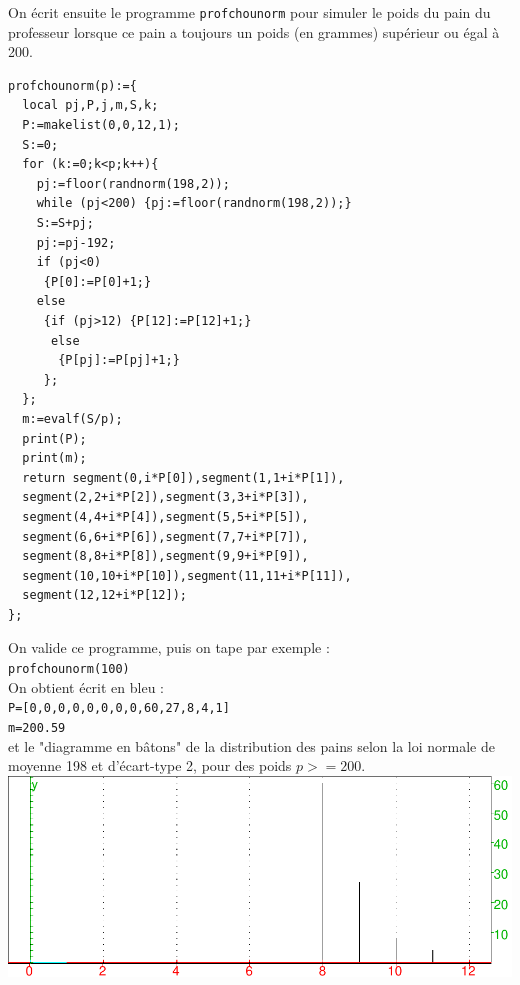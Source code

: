 \documentclass[a4paper,11pt]{book}
\begin{document}
On \'ecrit ensuite le programme {\tt profchounorm} pour simuler
le poids du pain du professeur lorsque ce pain a toujours un poids 
(en grammes) sup\'erieur ou \'egal \`a 200.
\begin{verbatim}
profchounorm(p):={
  local pj,P,j,m,S,k;
  P:=makelist(0,0,12,1);
  S:=0;
  for (k:=0;k<p;k++){
    pj:=floor(randnorm(198,2));	
    while (pj<200) {pj:=floor(randnorm(198,2));}
    S:=S+pj;
    pj:=pj-192;
    if (pj<0) 
     {P[0]:=P[0]+1;} 
    else
     {if (pj>12) {P[12]:=P[12]+1;}
      else
       {P[pj]:=P[pj]+1;}
     };
  };
  m:=evalf(S/p);
  print(P);
  print(m);
  return segment(0,i*P[0]),segment(1,1+i*P[1]),
  segment(2,2+i*P[2]),segment(3,3+i*P[3]),
  segment(4,4+i*P[4]),segment(5,5+i*P[5]),
  segment(6,6+i*P[6]),segment(7,7+i*P[7]),
  segment(8,8+i*P[8]),segment(9,9+i*P[9]),
  segment(10,10+i*P[10]),segment(11,11+i*P[11]),
  segment(12,12+i*P[12]);
};  
\end{verbatim}
On valide ce programme, puis on tape par exemple :\\
{\tt profchounorm(100)}\\
On obtient \'ecrit en bleu :\\
{\tt P=[0,0,0,0,0,0,0,0,60,27,8,4,1]}\\
{\tt m=200.59}\\
et le "diagramme en b\^atons" de la distribution des pains selon la loi normale
de moyenne 198 et d'\'ecart-type 2, pour des poids $p>=200$.\\

\includegraphics[width=\textwidth]{pain3}

\newpage
\printindex
\newpage
\tableofcontents
\end{document}
